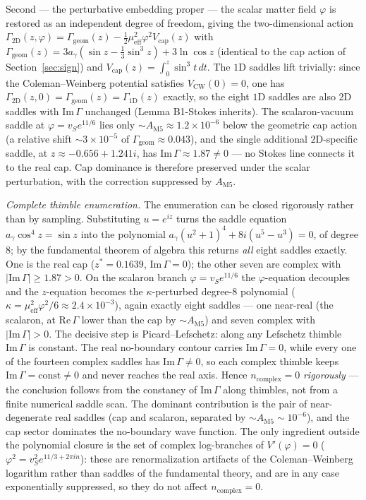\documentclass[11pt,a4paper]{article}
\theoremstyle{plain}
\theoremstyle{definition}
\theoremstyle{remark}
\newcommand{\ag}{a_\gamma}
\begin{document}
Second --- the perturbative embedding proper --- the scalar matter field $\varphi$ is restored as
an independent degree of freedom, giving the two-dimensional action $\Gamma_{2\mathrm{D}}(z,\varphi)
= \Gamma_{\mathrm{geom}}(z) - \tfrac12\mu_{\mathrm{eff}}^2\varphi^2 V_{\mathrm{cap}}(z)$ with
$\Gamma_{\mathrm{geom}}(z) = 3\ag(\sin z - \tfrac13\sin^3 z) + 3\ln\cos z$ (identical to the cap
action of Section~\ref{sec:sign}) and $V_{\mathrm{cap}}(z)=\int_0^z\sin^3 t\,dt$. The $1$D saddles
lift trivially: since the Coleman--Weinberg potential satisfies $V_{\mathrm{CW}}(0)=0$, one has
$\Gamma_{2\mathrm{D}}(z,0)=\Gamma_{\mathrm{geom}}(z)=\Gamma_{1\mathrm{D}}(z)$ exactly, so the eight
$1$D saddles are also $2$D saddles with $\mathrm{Im}\,\Gamma$ unchanged (Lemma B1-Stokes inherits).
The scalaron-vacuum saddle at $\varphi=v_S e^{11/6}$ lies only $\sim A_{\mathrm{M5}}\approx
1.2\times10^{-6}$ below the geometric cap action (a relative shift $\sim3\times10^{-5}$ of
$\Gamma_{\mathrm{geom}}\approx0.043$), and the single additional $2$D-specific saddle, at
$z\approx-0.656+1.241i$, has $\mathrm{Im}\,\Gamma\approx1.87\neq0$ --- no Stokes line connects it
to the real cap. Cap dominance is therefore preserved under the scalar perturbation, with the
correction suppressed by $A_{\mathrm{M5}}$.

\emph{Complete thimble enumeration.} The enumeration can be closed rigorously rather than by
sampling. Substituting $u=e^{iz}$ turns the saddle equation $\ag\cos^4 z = \sin z$ into the
polynomial $\ag(u^2+1)^4 + 8i(u^5-u^3)=0$, of degree $8$; by the fundamental theorem of algebra
this returns \emph{all} eight saddles exactly. One is the real cap ($z^*=0.1639$,
$\mathrm{Im}\,\Gamma=0$); the other seven are complex with $|\mathrm{Im}\,\Gamma|\ge1.87>0$. On
the scalaron branch $\varphi=v_S e^{11/6}$ the $\varphi$-equation decouples and the $z$-equation
becomes the $\kappa$-perturbed degree-$8$ polynomial ($\kappa=\mu_{\mathrm{eff}}^2\varphi^2/6
\approx2.4\times10^{-3}$), again exactly eight saddles --- one near-real (the scalaron, at
$\mathrm{Re}\,\Gamma$ lower than the cap by $\sim A_{\mathrm{M5}}$) and seven complex with
$|\mathrm{Im}\,\Gamma|>0$. The decisive step is Picard--Lefschetz: along any Lefschetz thimble
$\mathrm{Im}\,\Gamma$ is constant. The real no-boundary contour carries $\mathrm{Im}\,\Gamma=0$,
while every one of the fourteen complex saddles has $\mathrm{Im}\,\Gamma\neq0$, so each complex
thimble keeps $\mathrm{Im}\,\Gamma=\text{const}\neq0$ and never reaches the real axis. Hence
$n_{\mathrm{complex}}=0$ \emph{rigorously} --- the conclusion follows from the constancy of
$\mathrm{Im}\,\Gamma$ along thimbles, not from a finite numerical saddle scan. The dominant contribution is the pair of near-degenerate real saddles (cap and
scalaron, separated by $\sim A_{\mathrm{M5}}\sim10^{-6}$), and the cap sector dominates the
no-boundary wave function. The only ingredient outside the polynomial closure is the set of
complex log-branches of $V'(\varphi)=0$ ($\varphi^2=v_S^2 e^{11/3+2\pi i n}$): these are
renormalization artifacts of the Coleman--Weinberg logarithm rather than saddles of the
fundamental theory, and are in any case exponentially suppressed, so they do not affect
$n_{\mathrm{complex}}=0$.
\end{document}
